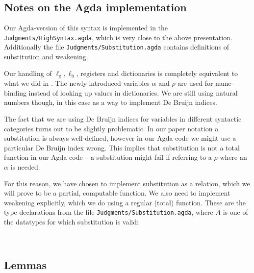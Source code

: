 \subsection{Notes on the Agda implementation}

Our Agda-version of this syntax is implemented in the
\texttt{Judgments/HighSyntax.agda}, which is very close to the above
presentation. Additionally the file \texttt{Judgments/Substitution.agda}
contains definitions of substitution and weakening.

Our handling of $\ell_{\mathrm{g}}, \ell_{\mathrm{h}}$, registers and
dictionaries is completely equivalent to what we did in \ATALe. The newly
introduced variables $\alpha$ and $\rho$ are used for name-binding instead of
looking up values in dictionaries. We are still using natural numbers though, in
this case as a way to implement De Bruijn indices.

The fact that we are using De Bruijn indices for variables in different
syntactic categories turns out to be slightly problematic. In our paper notation
a substitution is always well-defined, however in our Agda-code we might use a
particular De Bruijn index wrong. This implies that substitution is not a total
function in our Agda code -- a substitution might fail if referring to a $\rho$
where an $\alpha$ is needed.

For this reason, we have chosen to implement substitution as a relation, which
we will prove to be a partial, computable function. We also need to implement
weakening explicitly, which we do using a regular (total) function. These are
the type declarations from the file \texttt{Judgments/Substitution.agda}, where
$A$ is one of the datatypes for which substitution is valid:

\begin{code}
\>[2]\<[4]%
\>[4] \AgdaSymbol{:}       \<%
\\
\>[2]\<[4]%
\>[4] \AgdaSymbol{:}         \<%
\end{code}

\subsection{Lemmas}

